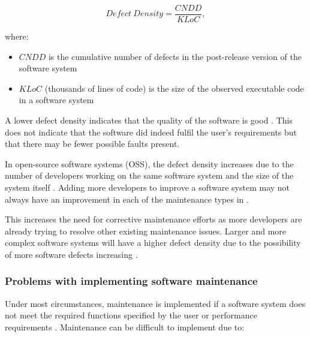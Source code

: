 \begin{equation}
	\label{eq:ch1_defectDensity}
	Defect~Density = \frac{CNDD}{KLoC},
\end{equation}

where:

\begin{itemize}
	\item $CNDD$ is the cumulative number of defects in the post-release version of the software system
	\item $KLoC$ (thousands of lines of code) is the size of the observed executable code in a software system 
\end{itemize}

A lower defect density indicates that the quality of the software is good \cite{Shah2012, Alenezi2016}. This does not indicate that the software did indeed fulfil the user's requirements but that there may be fewer possible faults present. \par In open-source software systems (OSS), the defect density increases due to the number of developers working on the same software system and the size of the system itself \cite{Rahmani2010}. Adding more developers to improve a software system may not always have an improvement in each of the maintenance types in .\par This increases the need for corrective maintenance efforts as more developers are already trying to resolve other existing maintenance issues. Larger and more complex software systems will have a higher defect density due to the possibility of more software defects increasing \cite{SourceForged2009}.

\subsubsection{Problems with implementing software maintenance}\label{sec:ch1_maintenanceProblems}
Under most circumstances, maintenance is implemented if a software system does not meet the required functions specified by the user or performance requirements \cite{Ogheneovo2014, Sneed2004}. Maintenance can be difficult to implement due to:

